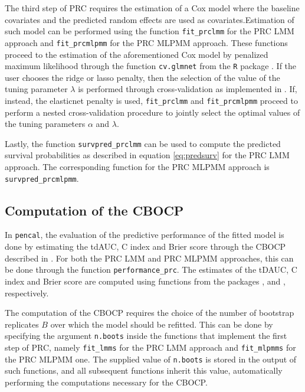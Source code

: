 The third step of PRC requires the estimation of a Cox model where the
baseline covariates and the predicted random effects are used as
covariates.Estimation of such model can be performed using the function
\texttt{fit\_prclmm} for the PRC LMM approach and \texttt{fit\_prcmlpmm}
for the PRC MLPMM approach. These functions proceed to the estimation of
the aforementioned Cox model by penalized maximum likelihood through the
function \texttt{cv.glmnet} from the \texttt{R} package 
\citep{simon2011}. If the user chooses the ridge or lasso penalty, then
the selection of the value of the tuning parameter \(\lambda\) is
performed through cross-validation as implemented in .
If, instead, the elasticnet penalty is used, \texttt{fit\_prclmm} and
\texttt{fit\_prcmlpmm} proceed to perform a nested cross-validation
procedure to jointly select the optimal values of the tuning parameters
\(\alpha\) and \(\lambda\).

Lastly, the function \texttt{survpred\_prclmm} can be used to compute
the predicted survival probabilities as described in equation
\eqref{eq:predsurv} for the PRC LMM approach. The corresponding function
for the PRC MLPMM approach is \texttt{survpred\_prcmlpmm}.

\subsection{Computation of the CBOCP}\label{computation-of-the-cbocp}

In \texttt{pencal}, the evaluation of the predictive performance of the
fitted model is done by estimating the tdAUC, C index and Brier score
through the CBOCP described in \citet{signorelli2021}. For both the PRC
LMM and PRC MLPMM approaches, this can be done through the function
\texttt{performance\_prc}. The estimates of the tDAUC, C index and Brier
score are computed using functions from the packages
 \citep{heagerty2022}, 
\citep{schroder2011} and  \citep{gerds2022},
respectively.

The computation of the CBOCP requires the choice of the number of
bootstrap replicates \(B\) over which the model should be refitted. This
can be done by specifying the argument \texttt{n.boots} inside the
functions that implement the first step of PRC, namely
\texttt{fit\_lmms} for the PRC LMM approach and \texttt{fit\_mlpmms} for
the PRC MLPMM one. The supplied value of \texttt{n.boots} is stored in
the output of such functions, and all subsequent functions inherit this
value, automatically performing the computations necessary for the
CBOCP.

